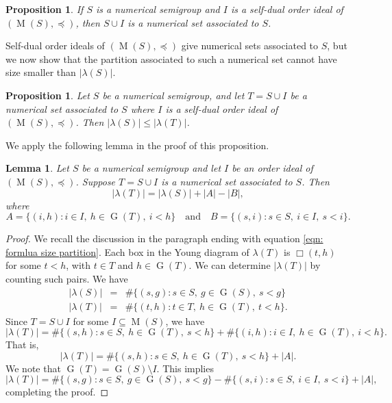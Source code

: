 \documentclass{amsproc}
\DeclareMathOperator{\G}{G}
\DeclareMathOperator{\M}{M}
\newtheorem{lemma}[theorem]{Lemma}
\newtheorem{prop}[theorem]{Proposition}
\theoremstyle{definition}
\theoremstyle{remark}
\numberwithin{equation}{section}
\begin{document}
\begin{prop}\cite[Proposition 3.2]{chen2023enumeratingnumericalsetsassociated}
If $S$ is a numerical semigroup and $I$ is a self-dual order ideal of $(\M(S),\preccurlyeq)$, then $S \cup I$ is a numerical set associated to $S$.
\end{prop}

Self-dual order ideals of $(\M(S),\preccurlyeq)$ give numerical sets associated to $S$, but we now show that the partition associated to such a numerical set cannot have size smaller than $|\lambda(S)|$.
\begin{prop}
\label{self-dual-implies-lambda-S-small}
    Let $S$ be a numerical semigroup, and let $T = S \cup I$ be a numerical set associated to $S$ where $I$ is a self-dual order ideal of $(\M(S),\preccurlyeq)$. Then $|\lambda(S)|\leq|\lambda(T)|$.
\end{prop}

We apply the following lemma in the proof of this proposition.
\begin{lemma}
    \label{set_counting}
    Let $S$ be a numerical semigroup and let $I$ be an order ideal of $(\M(S),\preccurlyeq)$. Suppose $T= S \cup I$ is a numerical set associated to $S$. Then 
    \[
    |\lambda(T)| = |\lambda(S)| + |A| - |B|,
    \]
    where 
    \[
    A=\{(i,h)\colon i\in I,\ h \in \G(T),\ i<h\}\quad\text{and}\quad B= \{(s,i)\colon s\in S,\ i\in I,\ s<i\}.
    \]
\end{lemma}

\begin{proof}
    \sloppy
We recall the discussion in the paragraph ending with equation \eqref{eqn: formlua size partition}.  Each box in the Young diagram of $\lambda(T)$ is $\Box(t,h)$ for some $t<h$, with $t \in T$ and $h \in \G(T)$. 
We can determine $|\lambda(T)|$ by counting such pairs.  We have
    \begin{eqnarray*}
    |\lambda(S)| & = & \#\{(s, g) \colon s \in S,\ g\in \G(S),\ s<g\} \\
    |\lambda(T)| & = & \#\{(t, h) \colon t \in T,\  h\in \G(T),\ t<h\}.
    \end{eqnarray*}
    Since $T= S\cup I$ for some $I\subseteq \M(S)$, we have  
    \[
    |\lambda(T)| = \#\{(s,h)\colon s\in S,\ h\in \G(T),\ s<h\} + \#\{(i, h)\colon i\in I,\ h\in \G(T),\ i<h\}.
    \]
That is, 
    \[ 
    |\lambda(T)| = \#\{(s,h)\colon s\in S,\ h\in \G(T),\ s<h\} + |A|.
    \]
We note that $\G(T) =  \G(S) \setminus I$. This implies
    \[
    |\lambda(T)| = \#\{(s,g)\colon s\in S,\ g\in \G(S),\ s<g\} - \#\{(s, i)\colon s\in S,\ i\in I,\ s<i\} + |A|,
    \]
completing the proof.
\end{proof}
\end{document}
